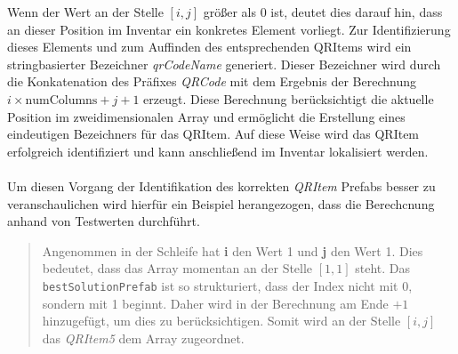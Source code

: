 Wenn der Wert an der Stelle $[i, j]$ größer als 0 ist, deutet dies darauf hin, dass an dieser Position im Inventar ein
konkretes Element vorliegt. Zur Identifizierung dieses Elements und zum Auffinden des entsprechenden QRItems wird ein
stringbasierter Bezeichner \textit{qrCodeName} generiert. Dieser Bezeichner wird durch die Konkatenation des Präfixes
\textit{QRCode} mit dem Ergebnis der Berechnung $i \times \text{numColumns} + j + 1$ erzeugt. Diese Berechnung berücksichtigt
die aktuelle Position im zweidimensionalen Array und ermöglicht die Erstellung eines eindeutigen Bezeichners für das QRItem.
Auf diese Weise wird das QRItem erfolgreich identifiziert und kann anschließend im Inventar lokalisiert werden.\\
\\
Um diesen Vorgang der Identifikation des korrekten \textit{QRItem} Prefabs besser zu veranschaulichen wird hierfür ein
Beispiel herangezogen, dass die Berechcnung anhand von Testwerten durchführt.

\begin{quote}
Angenommen in der Schleife hat \textbf{i} den Wert 1 und \textbf{j} den Wert 1. Dies bedeutet, dass das Array momentan
an der Stelle $[1, 1]$ steht. Das \texttt{bestSolutionPrefab} ist so strukturiert, dass der Index nicht mit 0, sondern
mit 1 beginnt. Daher wird in der Berechnung am Ende $+ 1$ hinzugefügt, um dies zu berücksichtigen. Somit wird an der
Stelle $[i, j]$ das \textit{QRItem5} dem Array zugeordnet.
\end{quote}

